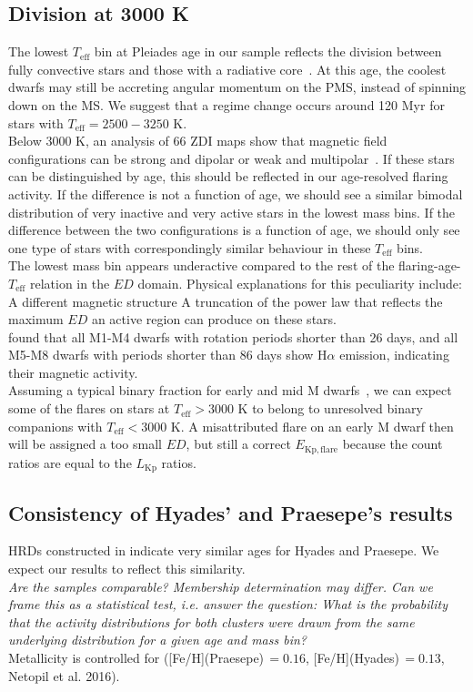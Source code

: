 \documentclass{aa}
\begin{document}
\subsection{Division at 3000 K}
The lowest $T_\mathrm{eff}$ bin at Pleiades age in our sample reflects the division between fully convective stars and those with a radiative core~\citep{reid_new_2005}. At this age, the coolest dwarfs may still be accreting angular momentum on the PMS, instead of spinning down on the MS. We suggest that a regime change occurs around 120 Myr for stars with $T_\mathrm{eff}=2500-3250$ K.
\\
Below 3000 K, an analysis of 66 ZDI maps show that magnetic field configurations can be strong and dipolar or weak and multipolar~\citep{morin_m4magneticfields_2008, see_zdispindown_2017}. If these stars can be distinguished by age, this should be reflected in our age-resolved flaring activity. If the difference is not a function of age, we should see a similar bimodal distribution of very inactive and very active stars in the lowest mass bins. If the difference between the two configurations is a function of age, we should only see one type of stars with correspondingly similar behaviour in these $T_\mathrm{eff}$ bins.
\\
The lowest mass bin appears underactive compared to the rest of the flaring-age-$T_\mathrm{eff}$ relation in the $ED$ domain. Physical explanations for this peculiarity include:
A different magnetic structure
A truncation of the power law that reflects the maximum $ED$ an active region can produce on these stars.
\\
\citet{west_magneticrotationage_2015} found that all M1-M4 dwarfs with rotation periods shorter than 26 days, and all M5-M8 dwarfs with periods shorter than 86 days show H$\alpha$ emission, indicating their magnetic activity.
\\
Assuming a typical binary fraction for early and mid M dwarfs~\citep{fischer_multiplicity_1992}, we can expect some of the flares on stars at $T_\mathrm{eff}>3000$ K to belong to unresolved binary companions with $T_\mathrm{eff}<3000$ K. A misattributed flare on an early M dwarf then will be assigned a too small $ED$, but still a correct $E_\mathrm{Kp, flare}$ because the count ratios are equal to the $L_\mathrm{Kp}$ ratios.
\subsection{Consistency of Hyades' and Praesepe's results}
HRDs constructed in \citet{gaia_dr2_2018_hrd} indicate very similar ages for Hyades and Praesepe. We expect our results to reflect this similarity.
\\
\textit{Are the samples comparable? Membership determination may differ.
Can we frame this as a statistical test, i.e. answer the question: What is the probability that the activity distributions for both clusters were drawn from the same underlying distribution for a given age and mass bin?}
\\
Metallicity is controlled for ([Fe/H](Praesepe)\,$=0.16$, [Fe/H](Hyades)\,$=0.13$, Netopil et al. 2016).
\end{document}
